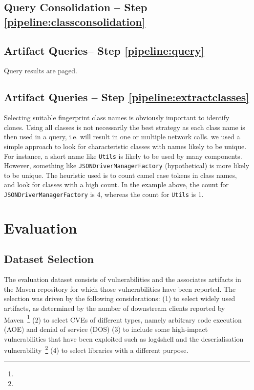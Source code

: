 \documentclass{article}
\begin{document}


\subsection{Query Consolidation -- Step \ref{pipeline:classconsolidation}}

\subsection{Artifact Queries-- Step \ref{pipeline:query}}

Query results are paged. 


\subsection {Artifact Queries -- Step \ref{pipeline:extractclasses}}

Selecting suitable fingerprint class names is obviously important to identify clones. Using all classes is not necessarily the best strategy as each class name is then used in a query, i.e. will result in one or multiple network calls. we used a simple approach to look for characteristic classes with names likely to be unique. For instance, a short name like \texttt{Utils} is likely to be used by many components. However, something like \texttt{JSONDriverManagerFactory} (hypothetical) is more likely to be unique. The heuristic used is to count camel case tokens in class names, and look for classes with a high count. In the example above, the count for \texttt{JSONDriverManagerFactory} is 4, whereas the count for \texttt{Utils} is 1.





  


\section{Evaluation}

\subsection{Dataset Selection}

The evaluation dataset consists of vulnerabilities and the associates artifacts in the Maven repository for which those vulnerabilities have been reported. The selection was driven by the following considerations: (1) to select widely used artifacts, as determined by the number of downstream clients reported by Maven~\footnote{} (2) to select CVEs of different types, namely arbitrary code execution (AOE) and denial of service (DOS) (3) to include some high-impact vulnerabilities that have been exploited such as log4shell and the deserialisation vulnerability~\footnote{} (4) to select libraries with a different purpose. 
\end{document}
